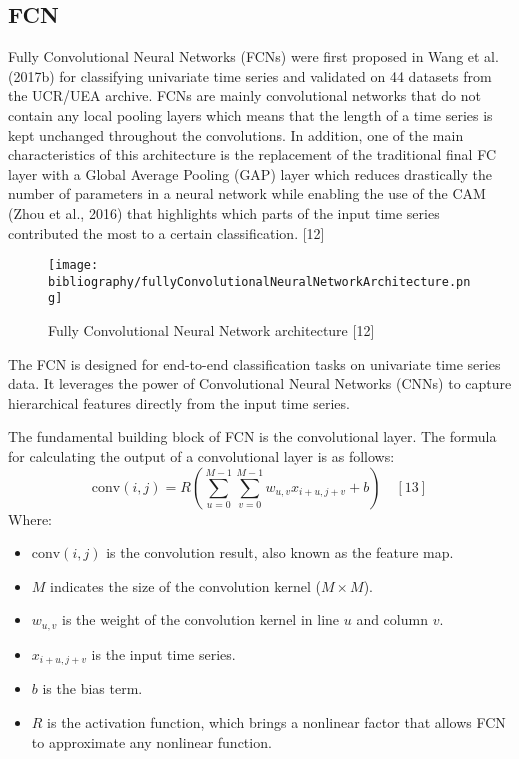\documentclass{ieeeojies}
\begin{document}
\subsection{FCN}
Fully Convolutional Neural Networks (FCNs) were first proposed in Wang et al. (2017b) for classifying univariate time series and validated on 44 datasets from the UCR/UEA archive. FCNs are mainly convolutional networks that do not contain any local pooling layers which means that the length of a time series is kept unchanged throughout the convolutions. In addition, one of the main characteristics of this architecture is the replacement of the traditional final FC layer with a Global Average Pooling (GAP) layer which reduces drastically the number of parameters in a neural network while enabling the use of the CAM (Zhou et al., 2016) that highlights which parts of the input time series contributed the most to a certain classification.  [12]
\begin{figure}[H]
    \centering
    \begin{minipage}{1.01\linewidth}
        \centering
        \texttt{[image: bibliography/fullyConvolutionalNeuralNetworkArchitecture.png]}
        \caption{Fully Convolutional Neural Network architecture [12]}
        \label{fig11}
    \end{minipage}
\end{figure}
The FCN is designed for end-to-end classification tasks on univariate time series data. It leverages the power of Convolutional Neural Networks (CNNs) to capture hierarchical features directly from the input time series.

The fundamental building block of FCN is the convolutional layer. The formula for calculating the output of a convolutional layer is as follows:
\begin{equation*}
    \text{conv}(i,j) = R \left( \sum_{u=0}^{M-1} \sum_{v=0}^{M-1} w_{u,v} x_{i+u,j+v} + b \right) \quad [13]
\end{equation*}
Where:
\begin{itemize}
    \item \(\text{conv}(i,j)\) is the convolution result, also known as the feature map.
    \item \(M\) indicates the size of the convolution kernel (\(M \times M\)).
    \item \(w_{u,v}\) is the weight of the convolution kernel in line \(u\) and column \(v\).
    \item \(x_{i+u,j+v}\) is the input time series.
    \item \(b\) is the bias term.
    \item \(R\) is the activation function, which brings a nonlinear factor that allows FCN to approximate any nonlinear function.
\end{itemize}
\end{document}
